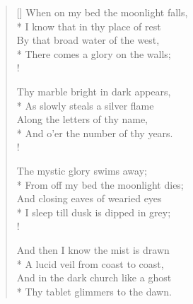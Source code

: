 \documentclass[MAIN]{subfiles}
\begin{document}
\settowidth{\versewidth}{When on my bed the moonlight falls,}
\begin{verse}[\versewidth]
When on my bed the moonlight falls,\\*
\vin I know that in thy place of rest\\
\vin By that broad water of the west,\\*
There comes a glory on the walls;\\!

Thy marble bright in dark appears,\\*
\vin As slowly steals a silver flame\\
\vin Along the letters of thy name,\\*
And o'er the number of thy years.\\!

The mystic glory swims away;\\*
\vin From off my bed the moonlight dies;\\
\vin And closing eaves of wearied eyes\\*
I sleep till dusk is dipped in grey;\\!

And then I know the mist is drawn\\*
\vin A lucid veil from coast to coast,\\
\vin And in the dark church like a ghost\\* 
Thy tablet glimmers to the dawn.
\end{verse}
\end{document}
